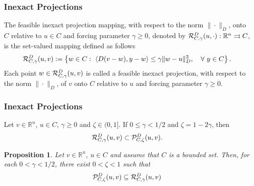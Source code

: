 \documentclass[xcolor=dvipsnames,aspectratio=169,13pt]{beamer} %
\newtheorem{proposition}[theorem]{Proposition}
\begin{document}
\begin{frame}[t]\frametitle{Inexact Projections}
  \begin{definition}
    The \textcolor{UFGred}{feasible inexact projection mapping}, with respect to the norm $\| \cdot \|_{D}$,  onto $C$ relative to $u \in C$ and forcing parameter $\gamma\geq 0$, denoted by ${\cal R}_{C,\gamma}^{D}(u, \cdot): {\mathbb R}^n \rightrightarrows C$,  is the set-valued mapping defined as follows
    \begin{equation*} 
      {\cal R}_{C,\gamma}^{D}(u, v):= \left\{w\in C:~\left\langle D(v-w), y-w \right\rangle \leq \gamma \|w-u\|_{D}^2, \quad \forall~ y \in C \right\}.
    \end{equation*}
    Each point $w\in {\cal R}_{C,\gamma}^{D}(u, v)$ is called a feasible inexact projection,  with respect to the norm $\| \cdot \|_{D}$,  of $v$ onto $C$ relative to $u$ and forcing parameter $\gamma\geq 0$.
  \end{definition}
\end{frame}





\begin{frame}[t]\frametitle{Inexact Projections}
  \begin{lemma}
    Let $v \in {\mathbb R}^n$, $u \in C$, $\gamma \geq 0$  and $\zeta\in (0, 1]$.  If  $0 \leq \gamma <1/2$ and $\zeta=1-2\gamma$, then
    \[
      {\cal R}_{C,\gamma}^{D}(u, v) \subset {\cal P}_{C,\zeta}^{D}(u, v).
    \]
  \end{lemma}

  \begin{proposition}
    Let $v \in {\mathbb R}^n$, $u \in C$ and assume that $C$ is a bounded set. Then, for each $0<\gamma < 1/2$,     there exist $0 < \zeta  <1$ such that
    \[
      {\cal P}_{C,\zeta}^{D}(u, v)  \subseteq    {\cal R}_{C,\gamma}^{D}(u, v)
    \]
  \end{proposition}
\end{frame}
\end{document}
